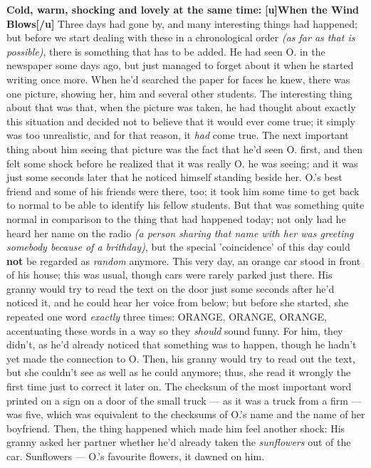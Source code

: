 \textbf{Cold, warm, shocking and lovely at the same time:}
\textbf{[u]When the Wind Blows[/u]}
Three days had gone by, and many interesting things had happened; but before we start dealing with these in a chronological order \emph{(as far as that is possible)}, there is something that has to be added. 
He had seen O. in the newspaper some days ago, but just managed to forget about it when he started writing once more. When he'd searched the paper for faces he knew, there was one picture, showing her, him and several other students. The interesting thing about that was that, when the picture was taken, he had thought about exactly this situation and decided not to believe that it would ever come true; it simply was too unrealistic, and for that reason, it \emph{had} come true. The next important thing about him seeing that picture was the fact that he'd seen O. first, and then felt some shock before he realized that it was really O. he was seeing; and it was just some seconds later that he noticed himself standing beside her. 
O.'s best friend and some of his friends were there, too; it took him some time to get back to normal to be able to identify his fellow students. 
But that was something quite normal in comparison to the thing that had happened today; not only had he heard her name on the radio \emph{(a person sharing that name with her was greeting somebody because of a brithday)}, but the special 'coincidence' of this day could \textbf{not} be regarded as \emph{random} anymore. This very day, an orange car stood in front of his house; this was usual, though cars were rarely parked just there. His granny would try to read the text on the door just some seconds after he'd noticed it, and he could hear her voice from below; but before she started, she repeated one word \emph{exactly} three times: ORANGE, ORANGE, ORANGE, accentuating these words in a way so they \emph{should} sound funny. 
For him, they didn't, as he'd already noticed that something was to happen, though he hadn't yet made the connection to O. 
Then, his granny would try to read out the text, but she couldn't see as well as he could anymore; thus, she read it wrongly the first time just to correct it later on. 
The checksum of the most important word printed on a sign on a door of the small truck --- as it was a truck from a firm --- was five, which was equivalent to the checksums of O.'s name and the name of her boyfriend. 
Then, the thing happened which made him feel another shock: His granny asked her partner whether he'd already taken the \emph{sunflowers} out of the car. Sunflowers --- O.'s favourite flowers, it dawned on him. 
